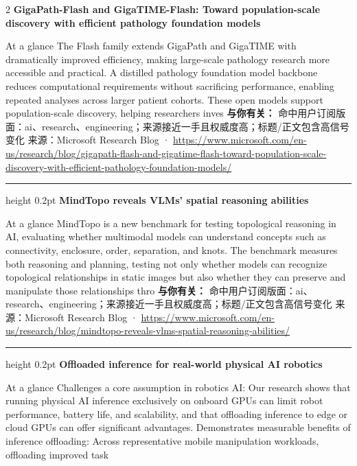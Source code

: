 \documentclass[10.5pt]{ctexart}
\begin{document}
\begin{multicols}{2}
{\large\bfseries GigaPath-Flash and GigaTIME-Flash: Toward population-scale discovery with efficient pathology foundation models}\par
At a glance The Flash family extends GigaPath and GigaTIME with dramatically improved efficiency, making large-scale pathology research more accessible and practical. A distilled pathology foundation model backbone reduces computational requirements without sacrificing performance, enabling repeated analyses across larger patient cohorts. These open models support population-scale discovery, helping researchers inves
\textbf{与你有关：} 命中用户订阅版面：ai、research、engineering；来源接近一手且权威度高；标题/正文包含高信号变化
{\footnotesize\color{ormuted} 来源：Microsoft Research Blog · \url{https://www.microsoft.com/en-us/research/blog/gigapath-flash-and-gigatime-flash-toward-population-scale-discovery-with-efficient-pathology-foundation-models/}}
\vspace{2mm}
\hrule height 0.2pt
\vspace{2mm}
{\large\bfseries MindTopo reveals VLMs’ spatial reasoning abilities}\par
At a glance MindTopo is a new benchmark for testing topological reasoning in AI, evaluating whether multimodal models can understand concepts such as connectivity, enclosure, order, separation, and knots. The benchmark measures both reasoning and planning, testing not only whether models can recognize topological relationships in static images but also whether they can preserve and manipulate those relationships thro
\textbf{与你有关：} 命中用户订阅版面：ai、research、engineering；来源接近一手且权威度高；标题/正文包含高信号变化
{\footnotesize\color{ormuted} 来源：Microsoft Research Blog · \url{https://www.microsoft.com/en-us/research/blog/mindtopo-reveals-vlms-spatial-reasoning-abilities/}}
\vspace{2mm}
\hrule height 0.2pt
\vspace{2mm}
{\large\bfseries Offloaded inference for real-world physical AI robotics}\par
At a glance Challenges a core assumption in robotics AI: Our research shows that running physical AI inference exclusively on onboard GPUs can limit robot performance, battery life, and scalability, and that offloading inference to edge or cloud GPUs can offer significant advantages. Demonstrates measurable benefits of inference offloading: Across representative mobile manipulation workloads, offloading improved task

\end{multicols}
\end{document}
